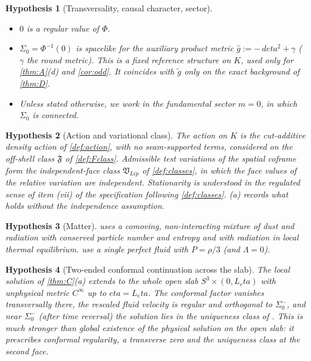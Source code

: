 \documentclass[11pt]{article}
\theoremstyle{canonmath}
\theoremstyle{canonpostulate}
\theoremstyle{canonproposition}
\theoremstyle{canonmath}
\theoremstyle{canonproposition}
\newtheorem{hypothesis}{Hypothesis}
\providecommand{\Vlip}{\mathfrak{V}_{\mathrm{Lip}}}
\providecommand{\Fcl}{\mathfrak{F}}
\providecommand{\Klein}{\mathcal{K}}
\def\mathrm#1{#1}%
\def\mathcal#1{#1}%
\def\eta{eta}%
\begin{document}
\begin{hypothesis}[Transversality, causal character, sector]\label{hyp:transverse}
\begin{itemize}
\item $0$ is a regular value of $\Phi$.
\item $\Sigma_0 = \Phi^{-1}(0)$ is spacelike for the auxiliary product metric $\hat g := -\,d\eta^2 + \gamma$ ($\gamma$ the round metric). This is a fixed reference structure on $\Klein$, used only for \cref{thm:A}(d) and \cref{cor:odd}. It coincides with $\tilde g$ only on the exact background of \cref{thm:D}.
\item Unless stated otherwise, we work in the fundamental sector $m = 0$, in which $\Sigma_0$ is connected.
\end{itemize}
\end{hypothesis}

\begin{hypothesis}[Action and variational class]\label{hyp:var}
The action on $\Klein$ is the cut-additive density action of \cref{def:action}, with no seam-supported terms, considered on the off-shell class $\Fcl$ of \cref{def:Fclass}. Admissible test variations of the spatial coframe form the independent-face class $\Vlip$ of \cref{def:classes}, in which the face values of the relative variation are independent. Stationarity is understood in the regulated sense of item (vii) of the specification following \cref{def:classes}. (a) records what holds without the independence assumption.
\end{hypothesis}

\begin{hypothesis}[Matter]\label{hyp:matter}
 uses a comoving, non-interacting mixture of dust and radiation with conserved particle number and entropy and with radiation in local thermal equilibrium.  use a single perfect fluid with $P = \rho/3$ (and $\Lambda = 0$).
\end{hypothesis}

\begin{hypothesis}[Two-ended conformal continuation across the slab]\label{hyp:global}
The local solution of \cref{thm:C}(a) extends to the whole open slab $S^3 \times (0, L_\eta)$ with unphysical metric $C^\infty$ up to $\eta = L_\eta$. The conformal factor vanishes transversally there, the rescaled fluid velocity is regular and orthogonal to $\Sigma_0^-$, and near $\Sigma_0^-$ (after time reversal) the solution lies in the uniqueness class of \cite{AnguigeTod1999a}. This is much stronger than global existence of the physical solution on the open slab: it prescribes conformal regularity, a transverse zero and the uniqueness class at the second face.
\end{hypothesis}
\end{document}
